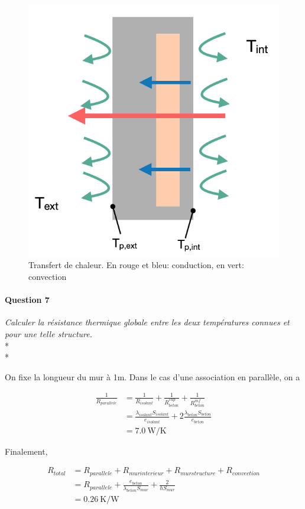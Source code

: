 \documentclass[oneside,a4paper,13pt]{book}
\begin{document}
\begin{figure}[h!]
\centering
  \includegraphics[width=0.4\linewidth]{q6.png}
  \caption{Transfert de chaleur. En rouge et bleu: conduction, en vert: convection}
  \label{fig:q1}
\end{figure}

\paragraph{Question 7} 
\textit{Calculer la résistance thermique globale entre les deux températures connues et pour une telle structure.} \\* \\*

On fixe la longueur du mur à 1m.
Dans le cas d'une association en parallèle, on a 

\begin{equation} \label{eq7}
\begin{split}
	\frac{1}{R_{parallele}} & = \frac{1}{R_{isolant}} + \frac{1}{R_{beton}^{sup}} + \frac{1}{R_{beton}^{inf}} \\
	& = \frac{\lambda_{isolant} S_{isolant}}{e_{isolant}} + 2 \frac{\lambda_{beton} S_{beton}}{e_{beton}} \\
	& = \SI{7.0}{\watt\per\kelvin}
\end{split}
\end{equation}

Finalement, 

\begin{equation} \label{eq8}
\begin{split}
	R_{total} & = R_{parallele} + R_{mur interieur} + R_{mur structure} + R_{convection} \\
	& = R_{parallele} +  \frac{e_{beton}}{\lambda_{beton} S_{mur}} + \frac{2}{h S_{mur}} \\
	& = \SI{0.26}{\kelvin\per\watt}
\end{split}
\end{equation}
\end{document}
